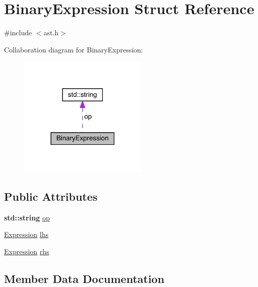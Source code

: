 \hypertarget{struct_binary_expression}{}\section{Binary\+Expression Struct Reference}
\label{struct_binary_expression}


{\ttfamily \#include $<$ast.\+h$>$}



Collaboration diagram for Binary\+Expression\+:\nopagebreak
\begin{figure}[H]
\begin{center}
\leavevmode
\includegraphics[width=174pt]{struct_binary_expression__coll__graph}
\end{center}
\end{figure}
\subsection*{Public Attributes}
\begin{DoxyCompactItemize}
\item 
\textbf{ std\+::string} \hyperlink{struct_binary_expression_a4c33b66e2ffc0a5ede2cdd190bf4bd75}{op}
\item 
\hyperlink{ast_8h_a4cb273a4d960cd13ea17d08f254493e8}{Expression} \hyperlink{struct_binary_expression_ab64ea2909c297e50015730abf814e82c}{lhs}
\item 
\hyperlink{ast_8h_a4cb273a4d960cd13ea17d08f254493e8}{Expression} \hyperlink{struct_binary_expression_aa25a00083ca8f135c0ffa46c527086a7}{rhs}
\end{DoxyCompactItemize}


\subsection{Member Data Documentation}
\mbox{\label{struct_binary_expression_ab64ea2909c297e50015730abf814e82c}} 

